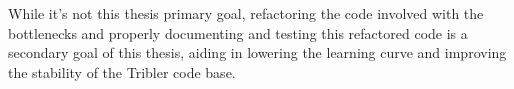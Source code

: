 While it's not this thesis primary goal, refactoring the code involved with the bottlenecks and properly documenting and testing this refactored code is a secondary goal of this thesis, aiding in lowering the learning curve and improving the stability of the Tribler code base.




